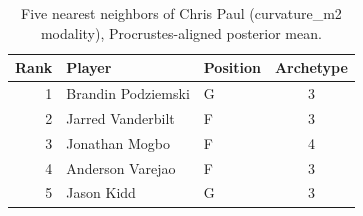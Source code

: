 \begin{table}[htbp]
  \centering\small
  \begin{tabular}{rllc}
    \toprule
    Rank & Player & Position & Archetype \\
    \midrule
    1 & Brandin Podziemski & G & 3 \\
    2 & Jarred Vanderbilt & F & 3 \\
    3 & Jonathan Mogbo & F & 4 \\
    4 & Anderson Varejao & F & 3 \\
    5 & Jason Kidd & G & 3 \\
    \bottomrule
  \end{tabular}
  \caption{Five nearest neighbors of Chris Paul (curvature_m2 modality), Procrustes-aligned posterior mean.}
  \label{tab:Chris_Paul_neighbors_curvature_m2}
\end{table}

